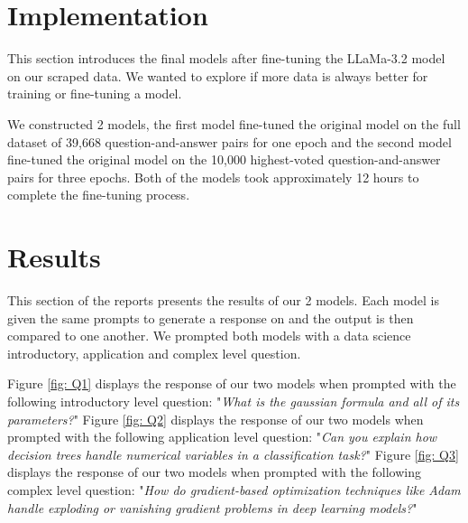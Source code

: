 \documentclass[10pt]{article}
\begin{document}
\section{Implementation}

This section introduces the final models after fine-tuning the LLaMa-3.2 model on our scraped data.
We wanted to explore if more data is always better for training or fine-tuning a model.

We constructed 2 models, the first model fine-tuned the original model on the full dataset of
39,668 question-and-answer pairs for one epoch and the second model fine-tuned the original model
on the 10,000 highest-voted question-and-answer pairs for three epochs. Both of the models took
approximately 12 hours to complete the fine-tuning process.

\section{Results}

This section of the reports presents the results of our 2 models. Each model is given the
same prompts to generate a response on and the output is then compared to one another.
We prompted both models with a data science introductory, application and complex level question.

Figure \ref{fig: Q1} displays the response of our two models when prompted with the following introductory
level question: "\textit{What is the gaussian formula and all of its parameters?}"
Figure \ref{fig: Q2} displays the response of our two models when prompted with the following application
level question: "\textit{Can you explain how decision trees handle numerical variables in a classification task?}"
Figure \ref{fig: Q3} displays the response of our two models when prompted with the following complex
level question: "\textit{How do gradient-based optimization techniques like Adam handle exploding or vanishing gradient problems in deep learning models?}"
\end{document}
